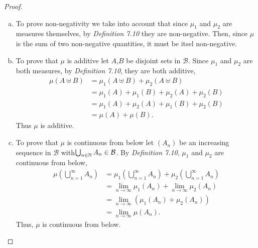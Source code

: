 \begin{questions}


\begin{solution}
  \begin{proof}
  \begin{enumerate}[a)]
  \item To prove non-negativity we take into account that since $\mu_1$ and $\mu_2$ are measures themselves, by \textit{Definition 7.10} they are non-negative. Then, since $\mu$ is the sum of two non-negative quantities, it must be itsel non-negative.
  \item To prove that $\mu$ is additive let $A$,$B$ be disjoint sets in $\mathcal{B}$. Since $\mu_1$ and $\mu_2$ are both measures, by \textit{Definition 7.10}, they are both additive,
  \begin{align*}
  \mu\left(A\uplus B\right)&=\mu_1\left(A\uplus B\right)+\mu_2\left(A\uplus B\right)\\
  &=\mu_1(A)+\mu_1(B)+\mu_2(A)+\mu_2(B)\\
  &=\mu_1(A)+\mu_2(A)+\mu_1(B)+\mu_2(B)\\
  &=\mu(A)+\mu(B).
  \end{align*}
  Thus $\mu$ is additive.
  \item To prove that $\mu$ is continuous from below let $(A_n)$ be an increasing sequence in $\mathcal{B}$ with\newline $\bigcup_{n\in\mathbb{N}}A_n\in\mathcal{B}$. By \textit{Definition 7.10}, $\mu_1$ and $\mu_2$ are continuous from below,
  \begin{align*}
  \mu\left(\bigcup_{n=1}^{\infty}A_n\right)&=\mu_1\left(\bigcup_{n=1}^{\infty}A_n\right)+\mu_2\left(\bigcup_{n=1}^{\infty}A_n\right)\\
  &=\lim_{n\rightarrow\infty}\mu_1(A_n)+\lim_{n\rightarrow\infty}\mu_2(A_n)\\
  &=\lim_{n\rightarrow\infty}\left(\mu_1(A_n)+\mu_2(A_n)\right)\\
  &=\lim_{n\rightarrow\infty}\mu(A_n).
  \end{align*}
  Thus, $\mu$ is continuous from below.
  \end{enumerate}
\end{proof}
\end{solution}
\end{questions}